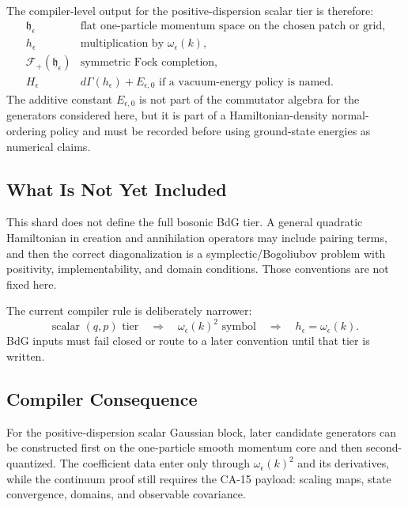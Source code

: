 The compiler-level output for the positive-dispersion scalar tier is therefore:
\[
\begin{array}{ll}
\mathfrak h_\epsilon
  & \text{flat one-particle momentum space on the chosen patch or grid},\\
h_\epsilon
  & \text{multiplication by }\omega_\epsilon(k),\\
\mathcal F_+(\mathfrak h_\epsilon)
  & \text{symmetric Fock completion},\\
H_\epsilon
  & d\Gamma(h_\epsilon) + E_{\epsilon,0}\text{ if a vacuum-energy policy is named}.
\end{array}
\]
The additive constant \(E_{\epsilon,0}\) is not part of the commutator algebra
for the generators considered here, but it is part of a Hamiltonian-density
normal-ordering policy and must be recorded before using ground-state energies
as numerical claims.

\subsection{What Is Not Yet Included}

This shard does not define the full bosonic BdG tier.  A general quadratic
Hamiltonian in creation and annihilation operators may include pairing terms,
and then the correct diagonalization is a symplectic/Bogoliubov problem with
positivity, implementability, and domain conditions.  Those conventions are not
fixed here.

The current compiler rule is deliberately narrower:
\[
  \text{scalar }(q,p)\text{ tier}
  \quad\Rightarrow\quad
  \omega_\epsilon(k)^2\text{ symbol}
  \quad\Rightarrow\quad
  h_\epsilon=\omega_\epsilon(k).
\]
BdG inputs must fail closed or route to a later convention until that tier is
written.

\subsection{Compiler Consequence}

For the positive-dispersion scalar Gaussian block, later candidate generators can
be constructed first on the one-particle smooth momentum core and then
second-quantized.  The
coefficient data enter only through \(\omega_\epsilon(k)^2\) and its
derivatives, while the continuum proof still requires the CA-15 payload:
scaling maps, state convergence, domains, and observable covariance.
